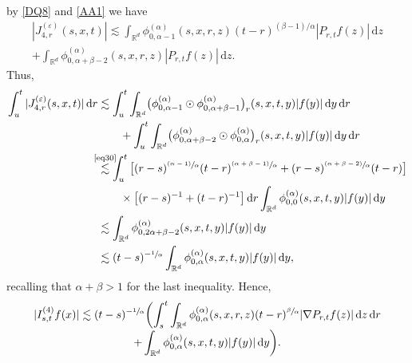 \documentclass[JEP,XML,SOM,Unicode,published]{cedram}
\newcommand{\psfrac}[2]{\sfrac{(#1)}{#2}}
\newcommand{\sm}[1]{\makebox[0pt][c]{\scriptsize#1}}
\theoremstyle{plain}
\theoremstyle{definition}
\let\eps\varepsilon
\newcommand\mR{\mathbb{R}}
\newcommand\1{{\mathbf{1}}}
\newcommand{\dif}{\,\mathrm{d}}
\begin{document}
by \eqref{DQ8} and \eqref{AA1} we have
\begin{multline*}
|J^{(\eps)}_{4,r}(s,x,t)|\lesssim\int_{\mR^d}\phi^{(\alpha)}_{0,\alpha-1}(s,x,r,z) (t-r)^{(\beta-1)/\alpha}|P_{r,t}f(z)|\dif z\\[-3pt]
+\int_{\mR^d}\phi^{(\alpha)}_{0,\alpha+\beta-2}(s,x,r,z)|P_{r,t}f(z)|\dif z.
\end{multline*}
Thus,\vspace*{-3pt}
\begin{align*}
\int^t_{u}|J^{(\eps)}_{4,r}(s,x,t)|\dif r&\lesssim\int^t_{u}\int_{\mR^d}\bigl(\phi^{(\alpha)}_{0,\alpha-1}
\odot\phi^{(\alpha)}_{0,\alpha+\beta-1}\bigr)_r(s,x,t,y)|f(y)|\dif y\dif r\\
&\qquad+\int^t_{u}\int_{\mR^d}\bigl(\phi^{(\alpha)}_{0,\alpha+\beta-2}
\odot\phi^{(\alpha)}_{0,\alpha}\bigr)_r(s,x,t,y)|f(y)|\dif y\dif r\\
&\stackrel{\sm{\eqref{eq30}}}{\lesssim}\int^t_u\big[(r-s)^{\psfrac{\alpha-1}{\alpha}}(t-r)^{\psfrac{\alpha+\beta-1}{\alpha}}+(r-s)^{\psfrac{\alpha+\beta-2}{\alpha}}(t-r)\big]\\
&\qquad\times\big[(r-s)^{-1}+(t-r)^{-1}\big]\dif r
\int_{\mR^d}\phi^{(\alpha)}_{0,0}(s,x,t,y)|f(y)|\dif y\\
&\lesssim\int_{\mR^d}\phi^{(\alpha)}_{0,2\alpha+\beta-2}(s,x,t,y)|f(y)|\dif y\\
&\lesssim (t-s)^{-\sfrac1\alpha}\int_{\mR^d}\phi^{(\alpha)}_{0,\alpha}(s,x,t,y)|f(y)|\dif y,
\end{align*}
recalling that $\alpha+\beta>1 $ for the last inequality.
Hence,\vspace*{-3pt}
\begin{multline*}
|I^{(4)}_{s,t} f(x)|
\lesssim(t-s)^{-\sfrac1\alpha}\biggl( \int^t_s\int_{\mR^d}\phi^{(\alpha)}_{0,\alpha}(s,x,r,z)(t-r)^{\sfrac{\beta}{\alpha}}|\nabla P_{r,t}f(z)|\dif z\dif r\\[-3pt]
+\int_{\mR^d}\phi^{(\alpha)}_{0,\alpha}(s,x,t,y)|f(y)|\dif y\biggr).
\end{multline*}
\end{document}
